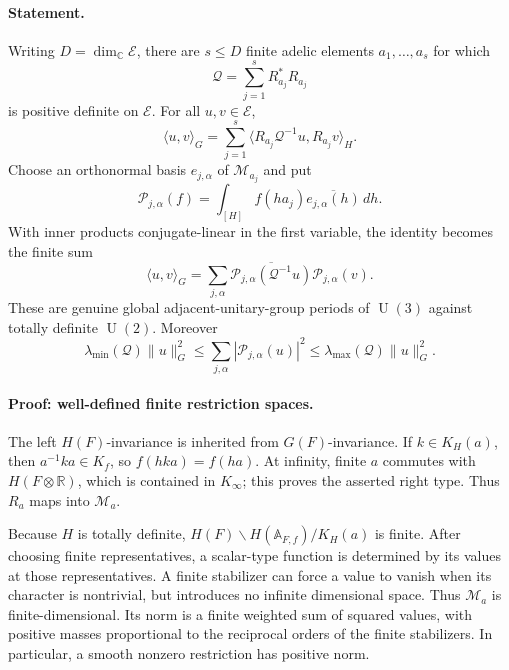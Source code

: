 \documentclass[11pt]{article}
\newcommand{\C}{\mathbb C}
\newcommand{\R}{\mathbb R}
\newcommand{\A}{\mathbb A}
\newcommand{\U}{\operatorname{U}}
\begin{document}
\paragraph{Statement.}
Writing $D=\dim_\C\mathcal E$, there are $s\leq D$ finite adelic
elements $a_1,\ldots,a_s$ for which
\[
 \mathcal Q=\sum_{j=1}^sR_{a_j}^*R_{a_j}
\]
is positive definite on $\mathcal E$. For all $u,v\in\mathcal E$,
\begin{equation}\label{A5-frame}
 \langle u,v\rangle_G
  =\sum_{j=1}^s
          \langle R_{a_j}\mathcal Q^{-1}u,R_{a_j}v\rangle_H.
\end{equation}
Choose an orthonormal basis $e_{j,\alpha}$ of $\mathcal M_{a_j}$ and
put
\[
 \mathcal P_{j,\alpha}(f)=
    \int_{[H]}f(ha_j)\overline{e_{j,\alpha}(h)}\,dh.
\]
With inner products conjugate-linear in the first variable, the
identity becomes the finite sum
\begin{equation}\label{A5-periods}
 \langle u,v\rangle_G
  =\sum_{j,\alpha}
       \overline{\mathcal P_{j,\alpha}(\mathcal Q^{-1}u)}
                   \mathcal P_{j,\alpha}(v).
\end{equation}
These are genuine global adjacent-unitary-group periods of $\U(3)$
against totally definite $\U(2)$. Moreover
\begin{equation}\label{A5-bounds}
 \lambda_{\min}(\mathcal Q)\|u\|_G^2
 \leq\sum_{j,\alpha}|\mathcal P_{j,\alpha}(u)|^2
 \leq\lambda_{\max}(\mathcal Q)\|u\|_G^2.
\end{equation}

\paragraph{Proof: well-defined finite restriction spaces.}
The left $H(F)$-invariance is inherited from $G(F)$-invariance. If
$k\in K_H(a)$, then $a^{-1}ka\in K_f$, so
$f(hka)=f(ha)$. At infinity, finite $a$ commutes with $H(F\otimes\R)$,
which is contained in $K_\infty$; this proves the asserted right type.
Thus $R_a$ maps into $\mathcal M_a$.

Because $H$ is totally definite,
$H(F)\backslash H(\A_{F,f})/K_H(a)$ is finite. After choosing finite
representatives, a scalar-type function is determined by its values
at those representatives. A finite stabilizer can force a value to
vanish when its character is nontrivial, but introduces no infinite
dimensional space. Thus $\mathcal M_a$ is finite-dimensional. Its
norm is a finite weighted sum of squared values, with positive masses
proportional to the reciprocal orders of the finite stabilizers. In
particular, a smooth nonzero restriction has positive norm.
\end{document}
